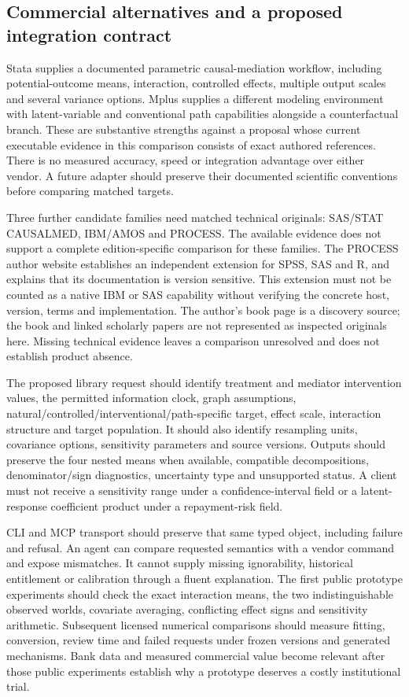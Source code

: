 \subsection{Commercial alternatives and a proposed integration contract}
\label{exec20:med-integration}
Stata supplies a documented parametric causal-mediation workflow, including potential-outcome means, interaction, controlled effects, multiple output scales and several variance options. Mplus supplies a different modeling environment with latent-variable and conventional path capabilities alongside a counterfactual branch. These are substantive strengths against a proposal whose current executable evidence in this comparison consists of exact authored references. There is no measured accuracy, speed or integration advantage over either vendor. A future adapter should preserve their documented scientific conventions before comparing matched targets.

Three further candidate families need matched technical originals: SAS/STAT CAUSALMED, IBM/AMOS and PROCESS. The available evidence does not support a complete edition-specific comparison for these families. The PROCESS author website establishes an independent extension for SPSS, SAS and R, and explains that its documentation is version sensitive. This extension must not be counted as a native IBM or SAS capability without verifying the concrete host, version, terms and implementation. The author's book page is a discovery source; the book and linked scholarly papers are not represented as inspected originals here. Missing technical evidence leaves a comparison unresolved and does not establish product absence.\citep{exec20_med_process_lead}

The proposed library request should identify treatment and mediator intervention values, the permitted information clock, graph assumptions, natural/controlled/interventional/path-specific target, effect scale, interaction structure and target population. It should also identify resampling units, covariance options, sensitivity parameters and source versions. Outputs should preserve the four nested means when available, compatible decompositions, denominator/sign diagnostics, uncertainty type and unsupported status. A client must not receive a sensitivity range under a confidence-interval field or a latent-response coefficient product under a repayment-risk field.

CLI and MCP transport should preserve that same typed object, including failure and refusal. An agent can compare requested semantics with a vendor command and expose mismatches. It cannot supply missing ignorability, historical entitlement or calibration through a fluent explanation. The first public prototype experiments should check the exact interaction means, the two indistinguishable observed worlds, covariate averaging, conflicting effect signs and sensitivity arithmetic. Subsequent licensed numerical comparisons should measure fitting, conversion, review time and failed requests under frozen versions and generated mechanisms. Bank data and measured commercial value become relevant after those public experiments establish why a prototype deserves a costly institutional trial.
